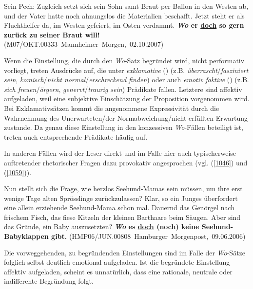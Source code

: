 {\begin{exe}
	\ex\label{1058} 
	\scriptsize
	Sein Pech: Zugleich setzt sich sein Sohn samt Braut per Ballon in den Westen ab, und der Vater hatte noch ahnungslos die Materialien beschafft. Jetzt 		steht er als Fluchthelfer da, im Westen gefeiert, im Osten verdammt. \textbf{\textit{Wo} er \underline{doch} so gern zurück zu seiner Braut will!} 	  
	\newline              		
	\hbox{}\hfill\hbox {(M07/OKT.00333 Mannheimer Morgen, 02.10.2007)}
\end{exe}	
Wenn die Einstellung, die durch den \textit{Wo}-Satz begründet wird, nicht performativ vorliegt, treten Ausdrücke auf, die  unter \textit{exklamative} (\citealt[39-40]{Avis2001}) (z.B. \textit{überrascht}/\textit{fasziniert sein}, \textit{komisch}/\textit{nicht normal}/\textit{erschreckend finden}) oder auch  \textit{emotiv faktive} (\citealt[363]{Kiparsky1970}) (z.B. \textit{sich freuen}/\textit{ärgern}, \textit{ge\-nervt}/\textit{traurig sein}) Prädikate fallen. Letztere sind affektiv aufgeladen, weil eine subjektive Einschätzung der Proposition vorgenommen wird. Bei Exklamativsätzen kommt die angenommene Expressivität durch die Wahrnehmung des Unerwarte\-ten/der Normabweichung/nicht erfüllten Erwartung zustande. Da genau diese Einstellung in den konzessiven \textit{Wo}-Fällen beteiligt ist, treten auch entsprechende Prädikate häufig auf.

In anderen Fällen wird der Leser direkt und im Falle hier auch typischerweise auftretender rhetorischer Fragen dazu provokativ angesprochen (vgl. (\ref{1046}) und (\ref{1059})).

\begin{exe}
	\ex\label{1059} 
	\scriptsize
	Nun stellt sich die Frage, wie herzlos Seehund-Mamas sein müssen, um ihre erst wenige Tage alten Sprösslinge zurückzulassen? Klar, so ein Junges 			überfordert eine allein erziehende Seehund-Mama schon mal. Dauernd das Genörgel nach frischem Fisch, das fiese Kitzeln der kleinen Barthaare beim 			Säugen. Aber sind das Gründe, ein Baby auszusetzten? \textbf{\textit{Wo} es \underline{doch} (noch) keine Seehund-Babyklappen gibt.}  
	\hfill\hbox {(HMP06/JUN.00808 Hamburger Morgenpost, 09.06.2006)}
\end{exe}
Die vorweggehenden, zu begründenden Einstellungen sind im Falle der \textit{Wo}-Sätze folglich selbst deutlich emotional aufgeladen. Ist die begründete Einstellung affektiv aufgeladen, scheint es unnatürlich, dass eine rationale, neutrale oder indifferente Begründung folgt.

}
